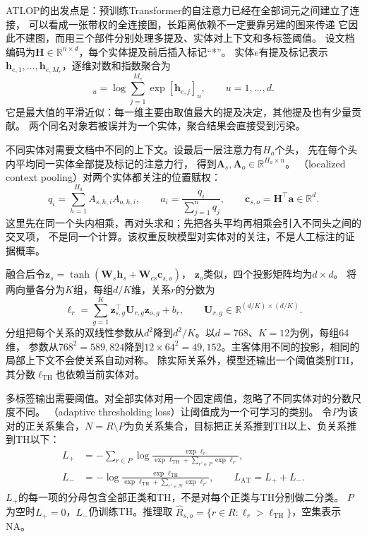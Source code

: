ATLOP的出发点是：预训练Transformer的自注意力已经在全部词元之间建立了连接，
可以看成一张带权的全连接图，长距离依赖不一定要靠另建的图来传递
它因此不建图，而用三个部件分别处理多提及、实体对上下文和多标签阈值。
设文档编码为$\bm{H}\in\mathbb{R}^{n\times d}$，每个实体提及前后插入标记“*”。
实体$e$有提及标记表示$\bm{h}_{e,1},\ldots,\bm{h}_{e,M_e}$，逐维对数和指数聚合为
\begin{equation}
  [\bm{h}_e]_u=\log\sum_{j=1}^{M_e}\exp[\bm{h}_{e,j}]_u,
  \qquad u=1,\ldots,d.
  \label{eq:nlp-extraction-atlop-entity}
\end{equation}
它是最大值的平滑近似：每一维主要由取值最大的提及决定，其他提及也有少量贡献。
两个同名对象若被误并为一个实体，聚合结果会直接受到污染。

不同实体对需要文档中不同的上下文。设最后一层注意力有$H_{\!a}$个头，
先在每个头内平均同一实体全部提及标记的注意力行，
得到$\bm{A}_s,\bm{A}_o\in\mathbb{R}^{H_{\!a}\times n}$。
（localized context pooling）对两个实体都关注的位置赋权：
\begin{equation}
  q_i=\sum_{h=1}^{H_{\!a}}A_{s,h,i}A_{o,h,i},
  \qquad a_i=\frac{q_i}{\sum_{j=1}^{n}q_j},
  \qquad \bm{c}_{s,o}=\bm{H}^{\top}\bm{a}\in\mathbb{R}^{d}.
  \label{eq:nlp-extraction-atlop-context}
\end{equation}
这里先在同一个头内相乘，再对头求和；先把各头平均再相乘会引入不同头之间的交叉项，
不是同一个计算。该权重反映模型对实体对的关注，不是人工标注的证据概率。

融合后令$\bm{z}_s=\tanh(\bm{W}_s\bm{h}_s+\bm{W}_{cs}\bm{c}_{s,o})$，
$\bm{z}_o$类似，四个投影矩阵均为$d\times d$。
将两向量各分为$K$组，每组$d/K$维，关系$r$的分数为
\begin{equation}
  \ell_r=\sum_{g=1}^{K}
  \bm{z}_{s,g}^{\top}\bm{U}_{r,g}\bm{z}_{o,g}+b_r,
  \qquad
  \bm{U}_{r,g}\in\mathbb{R}^{(d/K)\times(d/K)}.
  \label{eq:nlp-extraction-atlop-score}
\end{equation}
分组把每个关系的双线性参数从$d^2$降到$d^2/K$。以$d=768$、$K=12$为例，每组64维，
参数从$768^2=589{,}824$降到$12\times64^2=49{,}152$。主客体用不同的投影，相同的局部上下文不会使关系自动对称。
除实际关系外，模型还输出一个阈值类别TH，其分数$\ell_{\mathrm{TH}}$也依赖当前实体对。

多标签输出需要阈值。对全部实体对用一个固定阈值，忽略了不同实体对的分数尺度不同。
（adaptive thresholding loss）让阈值成为一个可学习的类别。
令$P$为该对的正关系集合，$N=R\setminus P$为负关系集合，目标把正关系推到TH以上、负关系推到TH以下：
\begin{equation}
  \begin{aligned}
    L_{+}&=-\sum_{r\in P}
      \log\frac{\exp\ell_r}
      {\exp\ell_{\mathrm{TH}}+\sum_{r'\in P}\exp\ell_{r'}},\\
    L_{-}&=-\log\frac{\exp\ell_{\mathrm{TH}}}
      {\exp\ell_{\mathrm{TH}}+\sum_{r'\in N}\exp\ell_{r'}},
    \qquad L_{\mathrm{AT}}=L_{+}+L_{-}.
  \end{aligned}
  \label{eq:nlp-extraction-atlop-loss}
\end{equation}
$L_+$的每一项的分母包含全部正类和TH，不是对每个正类与TH分别做二分类。
$P$为空时$L_+=0$，$L_-$仍训练TH。推理取
$\widehat{R}_{s,o}=\{r\in R:\ell_r>\ell_{\mathrm{TH}}\}$，空集表示NA。


